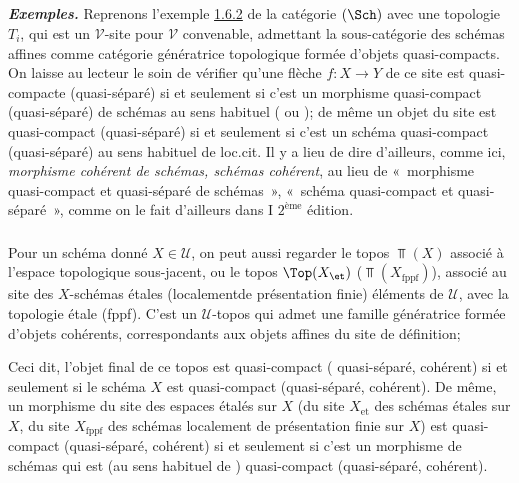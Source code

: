 \subsection{}
{\textit{\textbf{Exemples.}}} Reprenons l'exemple
\hyperref[VI.subsubsec1.6.2]{1.6.2} de la catégorie $(\Sch)$ avec une topologie
$T_i$, qui est un $𝒱$-site pour $𝒱$ convenable,
admettant la sous-catégorie des schémas affines comme catégorie
génératrice topologique formée d'objets quasi-compacts. On laisse au
lecteur le soin de vérifier qu'une flèche $f: X \to Y$ de ce site
est quasi-compacte (\resp quasi-séparé) si et seulement si c'est un
morphisme quasi-compact (\resp quasi-séparé) de schémas au sens
habituel (\cite{3} ou \cite{4}); de même un objet du site est
quasi-compact (\resp quasi-séparé) si et seulement si c'est un
schéma quasi-compact (\resp quasi-séparé) au sens habituel de
loc.cit. Il y a lieu de dire d'ailleurs, comme ici, \emph{morphisme
cohérent de schémas, schémas
  cohérent}, au lieu de « morphisme quasi-compact et quasi-séparé de
schémas », « schéma quasi-compact et quasi-séparé », comme on le
fait d'ailleurs dans \EGA I $2^{\text{ème}}$ édition.

\setcounter{subsection}{22}
\subsubsection{}

Pour un schéma donné $X \in 𝒰$, on peut aussi regarder le topos
$\Top(X)$ associé à l'espace topologique sous-jacent, ou le topos
$\Top (X_{\et})$ (\resp $\Top(X_{\text{fppf}})$), associé au site des
$X$-schémas étales (\resp localement\pageoriginale de présentation
finie) éléments de $𝒰$, avec la topologie étale (\resp fppf). C'est un
$𝒰$-topos qui admet une famille génératrice formée d'objets cohérents,
correspondants aux objets affines du site de définition;

Ceci dit, l'objet final de ce topos est quasi-compact (\resp
quasi-séparé, \resp cohérent) si et seulement si le schéma $X$ est
quasi-compact (\resp quasi-séparé, \resp cohérent). De même, un
morphisme du site des espaces étalés sur $X$ (\resp du site
$X_{\text{et}}$ des schémas étales sur $X$, \resp du site
$X_{\text{fppf}}$ des schémas localement de présentation finie sur
$X$) est quasi-compact (\resp quasi-séparé, \resp cohérent) si et
seulement si c'est un morphisme de schémas qui est (au sens habituel
de \loccit) quasi-compact (\resp quasi-séparé, \resp cohérent).

